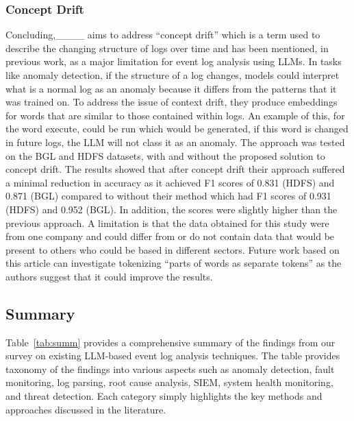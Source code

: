 \subsubsection{Concept Drift}
Concluding,____ aims to address ``concept drift'' which is a term used to describe the changing structure of logs over time and has been mentioned, in previous work, as a major limitation for event log analysis using LLMs. In tasks like anomaly detection, if the structure of a log changes, models could interpret what is a normal log as an anomaly because it differs from the patterns that it was trained on. To address the issue of context drift, they produce embeddings for words that are similar to those contained within logs. An example of this, for the word execute, could be run which would be generated, if this word is changed in future logs, the LLM will not class it as an anomaly. The approach was tested on the BGL and HDFS datasets, with and without the proposed solution to concept drift. The results showed that after concept drift their approach suffered a minimal reduction in accuracy as it achieved F1 scores of 0.831 (HDFS) and 0.871 (BGL) compared to without their method which had F1 scores of 0.931 (HDFS) and 0.952 (BGL). In addition, the scores were slightly higher than the previous approach. A limitation is that the data obtained for this study were from one company and could differ from or do not contain data that would be present to others who could be based in different sectors. Future work based on this article can investigate tokenizing ``parts of words as separate tokens'' as the authors suggest that it could improve the results.


\subsection{Summary}
Table~\ref{tab:summ} provides a comprehensive summary of the findings from our survey on existing LLM-based event log analysis techniques. The table provides taxonomy of the findings into various aspects such as anomaly detection, fault monitoring, log parsing, root cause analysis, SIEM, system health monitoring, and threat detection. Each category simply highlights the key methods and approaches discussed in the literature.
